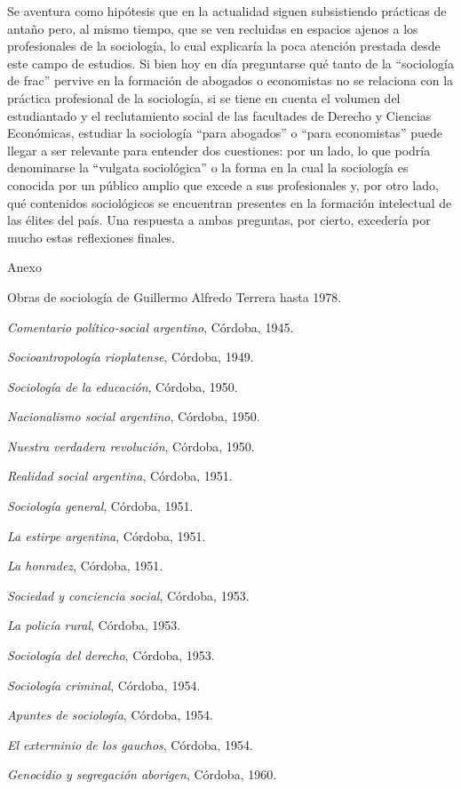 Se aventura como hipótesis que en la actualidad siguen subsistiendo prácticas de antaño pero, al mismo tiempo, que se ven recluidas en espacios ajenos a los profesionales de la sociología, lo cual explicaría la poca atención prestada desde este campo de estudios. Si bien hoy en día preguntarse qué tanto de la ``sociología de frac'' pervive en la formación de abogados o economistas no se relaciona con la práctica profesional de la sociología, si se tiene en cuenta el volumen del estudiantado y el reclutamiento social de las facultades de Derecho y Ciencias Económicas, estudiar la sociología ``para abogados'' o ``para economistas'' puede llegar a ser relevante para entender dos cuestiones: por un lado, lo que podría denominarse la ``vulgata sociológica'' o la forma en la cual la sociología es conocida por un público amplio que excede a sus profesionales y, por otro lado, qué contenidos sociológicos se encuentran presentes en la formación intelectual de las élites del país. Una respuesta a ambas preguntas, por cierto, excedería por mucho estas reflexiones finales.

Anexo

Obras de sociología de Guillermo Alfredo Terrera hasta 1978.

\emph{Comentario político-social argentino}, Córdoba, 1945.

\emph{Socioantropología rioplatense}, Córdoba, 1949.

\emph{Sociología de la educación}, Córdoba, 1950.

\emph{Nacionalismo social argentino}, Córdoba, 1950.

\emph{Nuestra verdadera revolución}, Córdoba, 1950.

\emph{Realidad social argentina}, Córdoba, 1951.

\emph{Sociología general}, Córdoba, 1951.

\emph{La estirpe argentina}, Córdoba, 1951.

\emph{La honradez}, Córdoba, 1951.

\emph{Sociedad y conciencia social}, Córdoba, 1953.

\emph{La policía rural}, Córdoba, 1953.

\emph{Sociología del derecho}, Córdoba, 1953.

\emph{Sociología criminal}, Córdoba, 1954.

\emph{Apuntes de sociología}, Córdoba, 1954.

\emph{El exterminio de los gauchos}, Córdoba, 1954.

\emph{Genocidio y segregación aborigen}, Córdoba, 1960.

